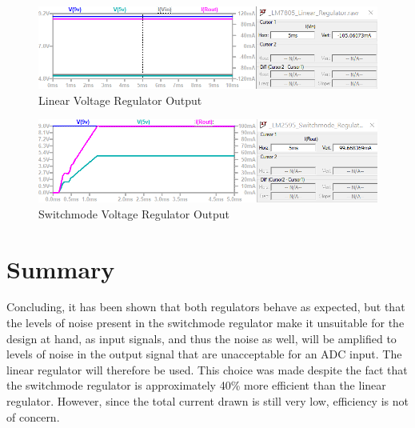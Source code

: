 \begin{figure}[h]
    \centering
    \includegraphics[width = 1\textwidth]{Figures/lmout.png}
    \caption{Linear Voltage Regulator Output}
    \label{fig:lmout}
\end{figure}

\begin{figure}[h]
    \centering
    \includegraphics[width = 1\textwidth]{Figures/smout.png}
    \caption{Switchmode Voltage Regulator Output}
    \label{fig:smout}
\end{figure}

\section{Summary}\label{sec:temp_summary}
Concluding, it has been shown that both regulators behave as expected, but that the levels of noise present in the switchmode regulator make it unsuitable for the design at hand, as input signals, and thus the noise as well, will be amplified to levels of noise in the output signal that are unacceptable for an ADC input. The linear regulator will therefore be used. This choice was made despite the fact that the switchmode regulator is approximately 40\% more efficient than the linear regulator. However, since the total current drawn is still very low, efficiency is not of concern.